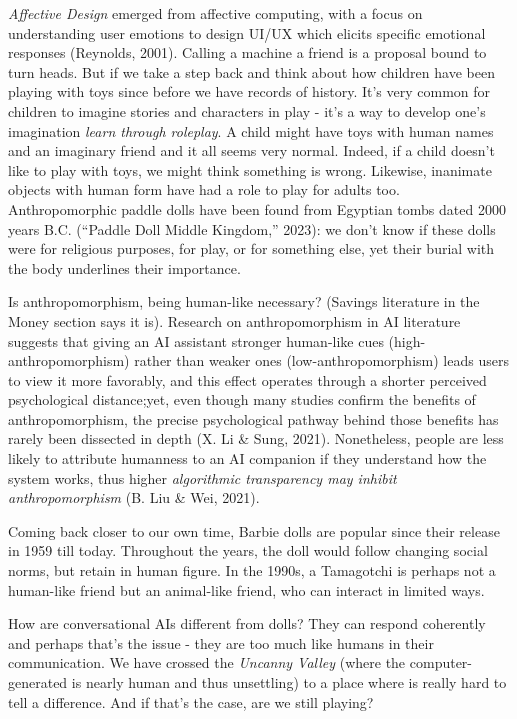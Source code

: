 \documentclass[
  letterpaper,
  DIV=11,
  numbers=noendperiod]{scrartcl}
\begin{document}
\emph{Affective Design} emerged from affective computing, with a focus
on understanding user emotions to design UI/UX which elicits specific
emotional responses (Reynolds, 2001). Calling a machine a friend is a
proposal bound to turn heads. But if we take a step back and think about
how children have been playing with toys since before we have records of
history. It's very common for children to imagine stories and characters
in play - it's a way to develop one's imagination \emph{learn through
roleplay}. A child might have toys with human names and an imaginary
friend and it all seems very normal. Indeed, if a child doesn't like to
play with toys, we might think something is wrong. Likewise, inanimate
objects with human form have had a role to play for adults too.
Anthropomorphic paddle dolls have been found from Egyptian tombs dated
2000 years B.C. ({``Paddle {Doll} {\textbar} {Middle Kingdom},''} 2023):
we don't know if these dolls were for religious purposes, for play, or
for something else, yet their burial with the body underlines their
importance.

Is anthropomorphism, being human-like necessary? (Savings literature in
the Money section says it is). Research on anthropomorphism in AI
literature suggests that giving an AI assistant stronger human-like cues
(high-anthropomorphism) rather than weaker ones (low-anthropomorphism)
leads users to view it more favorably, and this effect operates through
a shorter perceived psychological distance;yet, even though many studies
confirm the benefits of anthropomorphism, the precise psychological
pathway behind those benefits has rarely been dissected in depth (X. Li
\& Sung, 2021). Nonetheless, people are less likely to attribute
humanness to an AI companion if they understand how the system works,
thus higher \emph{algorithmic transparency may inhibit anthropomorphism}
(B. Liu \& Wei, 2021).

Coming back closer to our own time, Barbie dolls are popular since their
release in 1959 till today. Throughout the years, the doll would follow
changing social norms, but retain in human figure. In the 1990s, a
Tamagotchi is perhaps not a human-like friend but an animal-like friend,
who can interact in limited ways.

How are conversational AIs different from dolls? They can respond
coherently and perhaps that's the issue - they are too much like humans
in their communication. We have crossed the \emph{Uncanny Valley} (where
the computer-generated is nearly human and thus unsettling) to a place
where is really hard to tell a difference. And if that's the case, are
we still playing?
\end{document}

